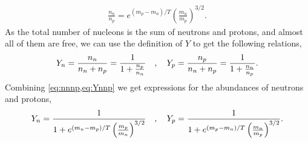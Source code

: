 \begin{align}
    \frac{n_n}{n_p}=e^{(m_p-m_n)/T} \left( \frac{m_n}{ m_p} \right)^{3/2}.
    \label{eq:nnnp}
\end{align}
As the total number of nucleons is the sum of neutrons and protons, and almost all of them are free, we can use the definition of $Y$ to get the following relations,
\begin{align}
    Y_n=\frac{n_n}{n_n+n_p}=\frac{1}{1+\frac{n_p}{n_n}}\quad , \quad Y_p=\frac{n_p}{n_n+n_p}=\frac{1}{1+\frac{n_n}{n_p}}.
    \label{eq:Ynnp}
\end{align}
Combining \cref{eq:nnnp,eq:Ynnp} we get expressions for the abundances of neutrons and protons,
\begin{align}
    Y_n=\frac{1}{1+e^{(m_n-m_p)/T} \left( \frac{m_p}{ m_n} \right)^{3/2}} \quad , \quad Y_p=\frac{1}{1+e^{(m_p-m_n)/T} \left( \frac{m_n}{ m_p} \right)^{3/2}}.
\end{align}